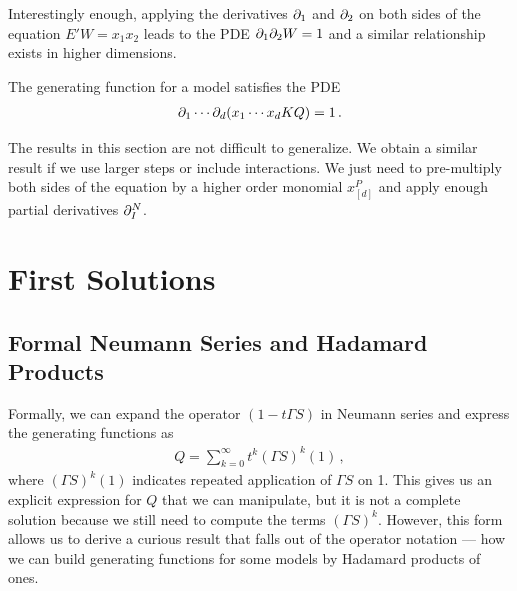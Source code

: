 Interestingly enough, applying the derivatives $\partial_1$ and $\partial_2$ on both sides of the equation $E'W = x_1x_2$ leads to the PDE $\partial_1\partial_2 W = 1$ and a similar relationship exists in higher dimensions.
\begin{prop} The generating function for a \classic \dD model satisfies the PDE
\begin{align}
	\partial_1\cdots\partial_d (x_1\cdots x_d KQ) = 1\,.
\end{align}
\end{prop}
The results in this section are not difficult to generalize. We obtain a similar result if we use larger steps or include interactions. We just need to pre-multiply both sides of the equation by a higher order monomial $x_{[d]}^P$ and apply enough partial derivatives $\partial_I^N$.
\section{First Solutions}
\subsection{Formal Neumann Series and Hadamard Products}
Formally, we can expand the operator $(1-t\Gamma S)$ in Neumann series and express the generating functions as
\begin{align}
	Q = \sum_{k=0}^{\infty}t^k (\Gamma S)^k(1)\,,
\end{align}
where $(\Gamma S)^k(1)$ indicates repeated application of $\Gamma S$ on 1. This gives us an explicit expression for $Q$ that we can manipulate, but it is not a complete solution because we still need to compute the terms $(\Gamma S)^k$. However, this form allows us to derive a curious result that falls out of the operator notation --- how we can build generating functions for some \highD models by Hadamard products of \lowD ones.

